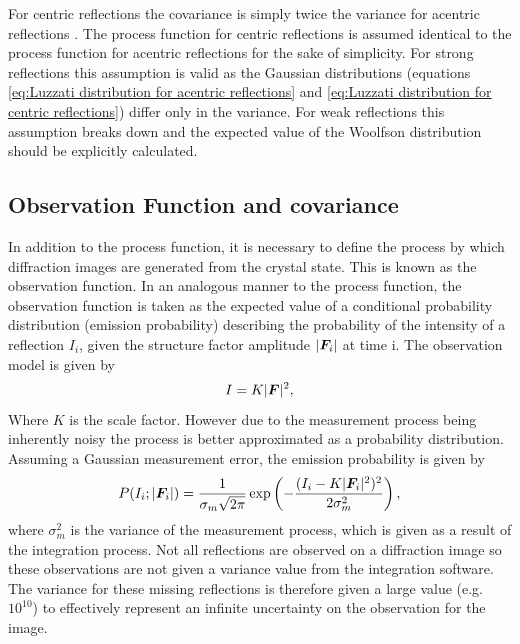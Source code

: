 For centric reflections the covariance is simply twice the variance for acentric reflections \cite{terwilliger1996bayesian}.
The process function for centric reflections is assumed identical to the process function for acentric reflections for the sake of simplicity.
For strong reflections this assumption is valid as the Gaussian distributions (equations \ref{eq:Luzzati distribution for acentric reflections} and \ref{eq:Luzzati distribution for centric reflections}) differ only in the variance.
For weak reflections this assumption breaks down and the expected value of the Woolfson distribution should be explicitly calculated.

\subsection{Observation Function and covariance}
\label{sub:Observation Function and covariance}
In addition to the process function, it is necessary to define the process by which diffraction images are generated from the crystal state.
This is known as the observation function.
In an analogous manner to the process function, the observation function is taken as the expected value of a conditional probability distribution (emission probability) describing the probability of the intensity of a reflection $I_i$, given the structure factor amplitude $|\boldsymbol{F}_i|$ at time i.
The observation model is given by \cite{otwinowski2003multiparametric}
\begin{equation}
    I = K |\boldsymbol{F}|^2,
    \label{eq:Observation Model}
\end{equation}
Where $K$ is the scale factor.
However due to the measurement process being inherently noisy the process is better approximated as a probability distribution.
Assuming a Gaussian measurement error, the emission probability is given by
\begin{equation}
    P(I_i ; |\boldsymbol{F}_i|) = \frac{1}{\sigma_m \sqrt{2 \pi}} \exp \left(-\frac{(I_i - K|\boldsymbol{F}_i|^2)^2}{2 \sigma_m^2}\right),
\end{equation}
where $\sigma_m^2$ is the variance of the measurement process, which is given as a result of the integration process.
Not all reflections are observed on a diffraction image so these observations are not given a variance value from the integration software.
The variance for these missing reflections is therefore given a large value (e.g. $10^{10}$) to effectively represent an infinite uncertainty on the observation for the image.

